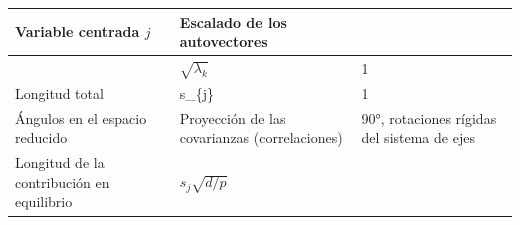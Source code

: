 \documentclass[]{book}
\theoremstyle{definition}
\theoremstyle{definition}
\theoremstyle{definition}
\theoremstyle{remark}
\begin{document}
\begin{longtable}[]{@{}lll@{}}
\toprule
\begin{minipage}[b]{0.22\columnwidth}\raggedright
Variable centrada \(j\)\strut
\end{minipage} & \begin{minipage}[b]{0.38\columnwidth}\raggedright
Escalado de los autovectores\strut
\end{minipage} & \begin{minipage}[b]{0.31\columnwidth}\raggedright
\strut
\end{minipage}\tabularnewline
\midrule
\endhead
\begin{minipage}[t]{0.22\columnwidth}\raggedright
\strut
\end{minipage} & \begin{minipage}[t]{0.38\columnwidth}\raggedright
\(\sqrt{\lambda_{k}}\)\strut
\end{minipage} & \begin{minipage}[t]{0.31\columnwidth}\raggedright
1\strut
\end{minipage}\tabularnewline
\begin{minipage}[t]{0.22\columnwidth}\raggedright
Longitud total\strut
\end{minipage} & \begin{minipage}[t]{0.38\columnwidth}\raggedright
s\_\{j\}\strut
\end{minipage} & \begin{minipage}[t]{0.31\columnwidth}\raggedright
1\strut
\end{minipage}\tabularnewline
\begin{minipage}[t]{0.22\columnwidth}\raggedright
Ángulos en el espacio reducido\strut
\end{minipage} & \begin{minipage}[t]{0.38\columnwidth}\raggedright
Proyección de las covarianzas (correlaciones)\strut
\end{minipage} & \begin{minipage}[t]{0.31\columnwidth}\raggedright
90°, rotaciones rígidas del sistema de ejes\strut
\end{minipage}\tabularnewline
\begin{minipage}[t]{0.22\columnwidth}\raggedright
Longitud de la contribución en equilibrio\strut
\end{minipage} & \begin{minipage}[t]{0.38\columnwidth}\raggedright
\(s_{j}\sqrt{d/p}\)\strut
\end{minipage} & \begin{minipage}[t]{0.31\columnwidth}\raggedright

\end{minipage}
\end{longtable}
\end{document}
